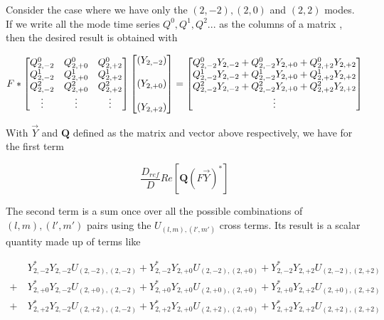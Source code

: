 Consider the case where we have only the $(2,-2), (2,0)$ and $(2,2)$ modes. If we write all the mode time series $Q^0, Q^1, Q^2...$ as the columns of a matrix , then the desired result is obtained with

\begin{align}
F*
\begin{bmatrix}
Q^0_{2,-2} & Q^0_{2,+0} & Q^0_{2,+2} \\
Q^1_{2,-2} & Q^1_{2,+0} & Q^1_{2,+2} \\ 
Q^2_{2,-2} & Q^2_{2,+0} & Q^2_{2,+2} \\
\vdots & \vdots & \vdots
\end{bmatrix}
\begin{bmatrix}
\left(Y_{2,-2}\right)\\
\hspace{0mm} \\
\left(Y_{2,+0}\right) \\
\hspace{0mm} \\
\left(Y_{2,+2}\right) \\
\end{bmatrix}
=
\begin{bmatrix}
Q^0_{2,-2} Y_{2,-2} + Q^0_{2,-2}Y_{2,+0} + Q^0_{2,+2}Y_{2,+2} \\
Q^1_{2,-2} Y_{2,-2} + Q^1_{2,-2}Y_{2,+0} + Q^1_{2,+2}Y_{2,+2} \\
Q^2_{2,-2} Y_{2,-2} + Q^2_{2,-2}Y_{2,+0} + Q^2_{2,+2}Y_{2,+2} \\
\vdots
\end{bmatrix}
\end{align}

With $\vec{Y}$ and $\mathbf{Q}$ defined as the matrix and vector above respectively, we have for the first term

\begin{equation}
\frac{D_{ref}}{D}Re\left[\mathbf{Q}\left(F\vec{Y}\right)^{*}\right]
\end{equation}

The second term is a sum once over all the possible combinations of $(l,m), (l',m')$ pairs using the $U_{(l,m),(l',m')}$ cross terms. Its result is a scalar quantity made up of terms like

\begin{align}
&Y_{2,-2}^{*}Y_{2,-2}U_{(2,-2),(2,-2)} + Y_{2,-2}^{*}Y_{2,+0}U_{(2,-2),(2,+0)} + Y_{2,-2}^{*}Y_{2,+2}U_{(2,-2),(2,+2)} \\ 
 +  \ &Y_{2,+0}^{*}Y_{2,-2}U_{(2,+0),(2,-2)} + Y_{2,+0}^{*}Y_{2,+0}U_{(2,+0),(2,+0)} + Y_{2,+0}^{*}Y_{2,+2}U_{(2,+0),(2,+2)} \\ 
+ \  &Y_{2,+2}^{*}Y_{2,-2}U_{(2,+2),(2,-2)} + Y_{2,+2}^{*}Y_{2,+0}U_{(2,+2),(2,+0)} + Y_{2,+2}^{*}Y_{2,+2}U_{(2,+2),(2,+2)}
\end{align}


